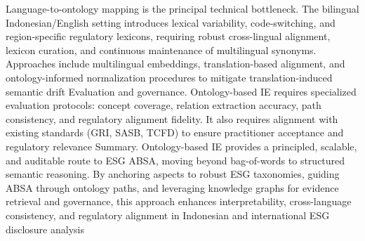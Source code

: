 Language-to-ontology mapping is the principal technical bottleneck. The bilingual Indonesian/English setting introduces lexical variability, code-switching, and region-specific regulatory lexicons, requiring robust cross-lingual alignment, lexicon curation, and continuous maintenance of multilingual synonyms. Approaches include multilingual embeddings, translation-based alignment, and ontology-informed normalization procedures to mitigate translation-induced semantic drift \cite{10.1016/j.inffus.2025.103073,10.1111/eufm.12509,10.48550/arxiv.2511.00024}
Evaluation and governance. Ontology-based IE requires specialized evaluation protocols: concept coverage, relation extraction accuracy, path consistency, and regulatory alignment fidelity. It also requires alignment with existing standards (GRI, SASB, TCFD) to ensure practitioner acceptance and regulatory relevance \cite{10.1177/09726225241237304,10.1111/ejed.70225}
Summary. Ontology-based IE provides a principled, scalable, and auditable route to ESG ABSA, moving beyond bag-of-words to structured semantic reasoning. By anchoring aspects to robust ESG taxonomies, guiding ABSA through ontology paths, and leveraging knowledge graphs for evidence retrieval and governance, this approach enhances interpretability, cross-language consistency, and regulatory alignment in Indonesian and international ESG disclosure analysis \cite{10.2139/ssrn.3738629,10.7849/ksnre.2022.0010,10.1145/3503044}



